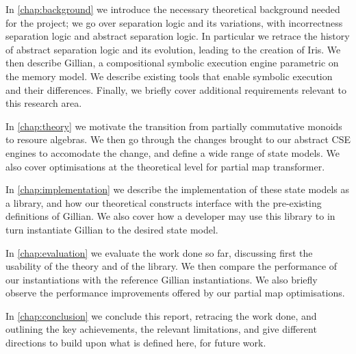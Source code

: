 In \autoref{chap:background} we introduce the necessary theoretical background needed for the project; we go over separation logic and its variations, with incorrectness separation logic and abstract separation logic. In particular we retrace the history of abstract separation logic and its evolution, leading to the creation of Iris. We then describe Gillian, a compositional symbolic execution engine parametric on the memory model. We describe existing tools that enable symbolic execution and their differences. Finally, we briefly cover additional requirements relevant to this research area.

In \autoref{chap:theory} we motivate the transition from partially commutative monoids to resoure algebras. We then go through the changes brought to our abstract CSE engines to accomodate the change, and define a wide range of state models. We also cover optimisations at the theoretical level for partial map transformer.

In \autoref{chap:implementation} we describe the implementation of these state models as a library, and how our theoretical constructs interface with the pre-existing definitions of Gillian. We also cover how a developer may use this library to in turn instantiate Gillian to the desired state model.

In \autoref{chap:evaluation} we evaluate the work done so far, discussing first the usability of the theory and of the library. We then compare the performance of our instantiations with the reference Gillian instantiations. We also briefly observe the performance improvements offered by our partial map optimisations.

In \autoref{chap:conclusion} we conclude this report, retracing the work done, and outlining the key achievements, the relevant limitations, and give different directions to build upon what is defined here, for future work.
